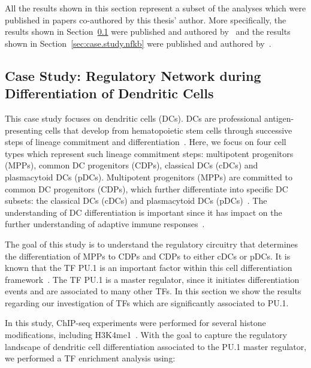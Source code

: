 All the results shown in this section represent a subset of the analyses which were published in papers co-authored by this thesis' author. More specifically, the results shown in Section~\ref{sec:case.study.dendritic} were published and authored by~\cite{lin2015} and the results shown in Section~\ref{sec:case.study.nfkb} were published and authored by~\cite{kolovos2016}.

\subsection{Case Study: Regulatory Network during Differentiation of Dendritic Cells}
\label{sec:case.study.dendritic}

This case study focuses on dendritic cells (DCs). DCs are professional antigen-presenting cells that develop from hematopoietic stem cells through successive steps of lineage commitment and differentiation~\citep{merad2013,belz2012}. Here, we focus on four cell types which represent such lineage commitment steps: multipotent progenitors (MPPs), common DC progenitors (CDPs), classical DCs (cDCs) and plasmacytoid DCs (pDCs). Multipotent progenitors (MPPs) are committed to common DC progenitors (CDPs), which further differentiate into specific DC subsets: the classical DCs (cDCs) and plasmacytoid DCs (pDCs)~\citep{belz2012,lin2015}. The understanding of DC differentiation is important since it has impact on the further understanding of adaptive immune responses~\citep{merad2013}.

The goal of this study is to understand the regulatory circuitry that determines the differentiation of MPPs to CDPs and CDPs to either cDCs or pDCs. It is known that the TF PU.1 is an important factor within this cell differentiation framework~\citep{belz2012}. The TF PU.1 is a master regulator, since it initiates differentiation events and are associated to many other TFs. In this section we show the results regarding our investigation of TFs which are significantly associated to PU.1.

In this study, ChIP-seq experiments were performed for several histone modifications, including H3K4me1~\citep{lin2015}. With the goal to capture the regulatory landscape of dendritic cell differentiation associated to the PU.1 master regulator, we performed a TF enrichment analysis using:

